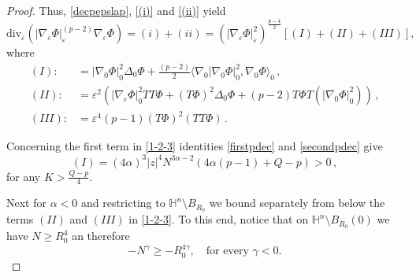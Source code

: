 \documentclass[10pt]{amsart}
\numberwithin{equation}{section}
\theoremstyle{definition}
\newcommand{\eps}{\varepsilon}
\newcommand{\scal}[2]{\langle {#1},{#2}\rangle}
\newcommand{\He}{\mathbb{H}}
\newcommand{\hgrad}{\nabla_{\mathnormal{H}}}
\newcommand{\hLap}{\Delta_{\mathnormal{H}}}
\newcommand{\hnorm}[1]{\|{#1}\|_{\mathnormal{H}}}
\begin{document}
\begin{proof}
Thus, \eqref{decpepslap}, \eqref{(i)} and \eqref{(ii)} yield 
\begin{equation}
\label{decpepslap2}
\mathrm{div}_{\eps} \left( |\nabla_{\eps} \Phi|_{\eps}^{(p-2)}\nabla_{\eps}\Phi \right) =(i)+(ii)= \left(|\nabla_{\eps}\Phi|_{\eps}^2 \right)^{\tfrac{p-4}{2}}\left[ (I) + (II) + (III)  \right],
\end{equation}
\noindent where
\begin{equation}
\label{1-2-3}
\begin{aligned}
(I):&= |\nabla_0 \Phi|_0^{2}\Delta_0 \Phi+\frac{(p-2)}2   \scal{\nabla_0 |\nabla_0 \Phi|^2_0}{\nabla_0 \Phi}_0 \, ,\\
(II):&= \varepsilon^2 \left( |\nabla_\varepsilon \Phi|_0^{2}TT\Phi+ (T\Phi)^2 \Delta_0 \Phi    +(p-2)T\Phi T \left( |\nabla_0 \Phi|^2_0\right) \right) \, , \\
(III):&= \eps^4 (p-1)  (T\Phi)^2 (TT\Phi) \, .
\end{aligned}
\end{equation}

\noindent Concerning the first term in \eqref{1-2-3} identities \eqref{firstpdec} and \eqref{secondpdec} give
\begin{equation}
\label{ineq(1)}
(I)= (4\alpha)^3 |z|^4 N^{3\alpha-2} (4\alpha (p-1)+Q-p)
>0 \, ,
\end{equation}
\noindent for any $K>\frac{Q-p}4$.

Next for $\alpha<0$ and restricting to $\He^n\setminus B_{R_0}$ we bound separately from below the terms $(II)$ and $(III)$ in \eqref{1-2-3}.
To this end, notice that on $\He^n\setminus B_{R_0}(0)$ we have $N \geq R_0^4$ an therefore 
\begin{equation}\label{StimaNR0}
-N^{\gamma} \geq -R_0^{4\gamma}, \quad \textrm{for every } \gamma<0.
\end{equation}


\end{proof}
\end{document}
